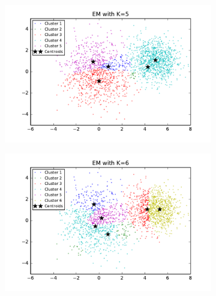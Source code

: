 \begin{figure}[htb]
\begin{subfigure}[b]{0.475\textwidth}
        \end{subfigure}
        \begin{subfigure}[b]{0.475\textwidth}  
            \centering 
            \includegraphics[width=\textwidth]{./figures/clustering_EM_5.pdf}
        \end{subfigure}
        \hfill
        \begin{subfigure}[b]{0.475\textwidth}   
            \centering 
            \includegraphics[width=\textwidth]{./figures/clustering_EM_6.pdf}
        \end{subfigure}
        \begin{subfigure}[b]{0.475\textwidth}   
            \centering 

\end{subfigure}
\end{figure}
